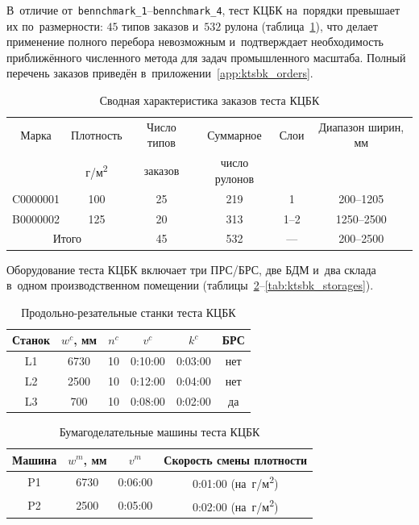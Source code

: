 В~отличие от~\texttt{bennchmark\_1}--\texttt{bennchmark\_4}, тест КЦБК на~порядки превышает их по~размерности: $45$ типов заказов и~$532$ рулона (таблица~\ref{tab:ktsbk_orders_summary}), что делает применение полного перебора невозможным и~подтверждает необходимость приближённого численного метода для задач промышленного масштаба.
Полный перечень заказов приведён в~приложении~\ref{app:ktsbk_orders}.

\begin{table}[htbp]
\centering
\caption{Сводная характеристика заказов теста КЦБК}
\label{tab:ktsbk_orders_summary}
\begin{tabular}{|c|c|c|c|c|c|}
\hline
Марка & Плотность & Число типов & Суммарное & Слои & Диапазон ширин, мм \\
 & г/м\textsuperscript{2} & заказов & число рулонов & &  \\
\hline
C0000001 & 100 & 25 & 219 & 1 & 200--1205 \\
B0000002 & 125 & 20 & 313 & 1--2 & 1250--2500 \\
\hline
\multicolumn{2}{|c|}{Итого} & 45 & 532 & --- & 200--2500 \\
\hline
\end{tabular}
\end{table}

Оборудование теста КЦБК включает три ПРС/БРС, две БДМ и~два склада в~одном производственном помещении (таблицы~\ref{tab:ktsbk_cutters}--\ref{tab:ktsbk_storages}).

\begin{table}[h]
\centering
\caption{Продольно-резательные станки теста КЦБК}
\label{tab:ktsbk_cutters}
\begin{tabular}{|c|c|c|c|c|c|}
\hline
Станок & ${w^c}$, мм & ${n^c}$ & ${v^c}$ & ${k^c}$ & БРС \\
\hline
L1 & 6730 & 10 & 0:10:00 & 0:03:00 & нет \\
L2 & 2500 & 10 & 0:12:00 & 0:04:00 & нет \\
L3 & 700 & 10 & 0:08:00 & 0:02:00 & да \\
\hline
\end{tabular}
\end{table}

\begin{table}[h]
\centering
\caption{Бумагоделательные машины теста КЦБК}
\label{tab:ktsbk_pm}
\begin{tabular}{|c|c|c|c|}
\hline
Машина & ${w^m}$, мм & ${v^m}$ & Скорость смены плотности \\
\hline
P1 & 6730 & 0:06:00 & 0:01:00 (на~г/м\textsuperscript{2}) \\
P2 & 2500 & 0:05:00 & 0:02:00 (на~г/м\textsuperscript{2}) \\
\hline
\end{tabular}
\end{table}

